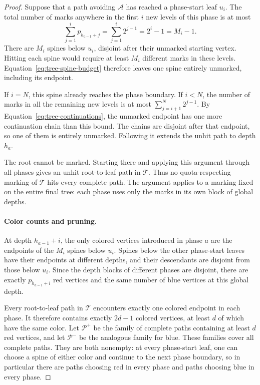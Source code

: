 \begin{proof}
Suppose that a path avoiding $\mathcal A$ has reached a phase-start leaf
$u_i$.  The total number of marks anywhere in the first $i$ new levels
of this phase is at most
\begin{equation}\label{eq:tree-spine-budget}
 \sum_{j=1}^{i}p_{h_{a-1}+j}
 =\sum_{j=1}^{i}2^{j-1}
 =2^i-1=M_i-1.
\end{equation}
There are $M_i$ spines below $u_i$, disjoint after their unmarked starting
vertex.  Hitting each spine would require at least $M_i$ different marks
in these levels.  Equation~\eqref{eq:tree-spine-budget} therefore leaves
one spine entirely unmarked, including its endpoint.

If $i=N$, this spine already reaches the phase boundary.  If $i<N$, the
number of marks in all the remaining new levels is at most
$\sum_{j=i+1}^{N}2^{j-1}$.  By
Equation~\eqref{eq:tree-continuations}, the unmarked endpoint has one more
continuation chain than this bound.  The chains are disjoint after that
endpoint, so one of them is entirely unmarked.  Following it extends the
unhit path to depth $h_a$.

The root cannot be marked.  Starting there and applying this argument
through all phases gives an unhit root-to-leaf path in $\mathcal T$.
Thus no quota-respecting marking of $\mathcal T$ hits every complete path.
The argument applies to a marking fixed on the entire final tree: each
phase uses only the marks in its own block of global depths.

\paragraph{Color counts and pruning.}
At depth $h_{a-1}+i$, the only colored vertices introduced in phase $a$
are the endpoints of the $M_i$ spines below $u_i$.  Spines below the other
phase-start leaves have their endpoints at different depths, and their
descendants are disjoint from those below $u_i$.  Since the depth blocks
of different phases are disjoint, there are exactly $p_{h_{a-1}+i}$ red
vertices and the same number of blue vertices at this global depth.

Every root-to-leaf path in $\mathcal T$ encounters exactly one colored
endpoint in each phase.  It therefore contains exactly $2d-1$ colored
vertices, at least $d$ of which have the same color.  Let
$\mathcal P^+$ be the family of complete paths containing at least $d$
red vertices, and let $\mathcal P^-$ be the analogous family for blue.
These families cover all complete paths.  They are both nonempty:
at every phase-start leaf, one can choose a spine of either color and
continue to the next phase boundary, so in particular there are paths
choosing red in every phase and paths choosing blue in every phase.


\end{proof}
